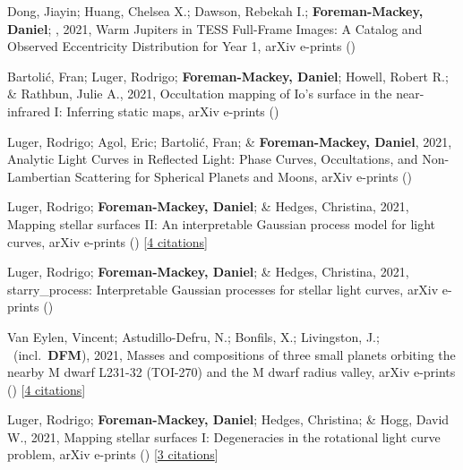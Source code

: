 \item[{\color{numcolor}\scriptsize14}] Dong, Jiayin; Huang, Chelsea X.; Dawson, Rebekah I.; \textbf{Foreman-Mackey, Daniel}; \etal, 2021, Warm Jupiters in TESS Full-Frame Images: A Catalog and Observed Eccentricity Distribution for Year 1, arXiv e-prints ()

\item[{\color{numcolor}\scriptsize13}] Bartoli{\'c}, Fran; Luger, Rodrigo; \textbf{Foreman-Mackey, Daniel}; Howell, Robert R.; \& Rathbun, Julie A., 2021, Occultation mapping of Io's surface in the near-infrared I: Inferring static maps, arXiv e-prints ()

\item[{\color{numcolor}\scriptsize12}] Luger, Rodrigo; Agol, Eric; Bartoli{\'c}, Fran; \& \textbf{Foreman-Mackey, Daniel}, 2021, Analytic Light Curves in Reflected Light: Phase Curves, Occultations, and Non-Lambertian Scattering for Spherical Planets and Moons, arXiv e-prints ()

\item[{\color{numcolor}\scriptsize11}] Luger, Rodrigo; \textbf{Foreman-Mackey, Daniel}; \& Hedges, Christina, 2021, Mapping stellar surfaces II: An interpretable Gaussian process model for light curves, arXiv e-prints () [\href{https://ui.adsabs.harvard.edu/abs/2021arXiv210201697L}{4 citations}]

\item[{\color{numcolor}\scriptsize10}] Luger, Rodrigo; \textbf{Foreman-Mackey, Daniel}; \& Hedges, Christina, 2021, starry{\_}process: Interpretable Gaussian processes for stellar light curves, arXiv e-prints ()

\item[{\color{numcolor}\scriptsize9}] Van Eylen, Vincent; Astudillo-Defru, N.; Bonfils, X.; Livingston, J.; \etal\ (incl.\ \textbf{DFM}), 2021, Masses and compositions of three small planets orbiting the nearby M dwarf L231-32 (TOI-270) and the M dwarf radius valley, arXiv e-prints () [\href{https://ui.adsabs.harvard.edu/abs/2021arXiv210101593V}{4 citations}]

\item[{\color{numcolor}\scriptsize8}] Luger, Rodrigo; \textbf{Foreman-Mackey, Daniel}; Hedges, Christina; \& Hogg, David W., 2021, Mapping stellar surfaces I: Degeneracies in the rotational light curve problem, arXiv e-prints () [\href{https://ui.adsabs.harvard.edu/abs/2021arXiv210200007L}{3 citations}]

